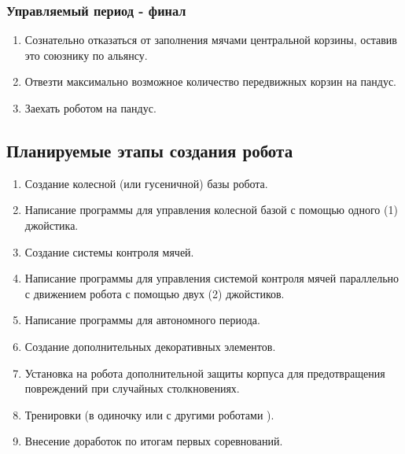 \subsubsection{Управляемый период - финал}
\begin{enumerate}
	\item Сознательно отказаться от заполнения мячами центральной корзины, оставив это союзнику по альянсу.
	\item Отвезти максимально возможное количество передвижных корзин на пандус.
	\item Заехать роботом на пандус. 
\end{enumerate}

\fillpage

\subsection{Планируемые этапы создания робота}
\begin{enumerate}
	\item Создание колесной (или гусеничной) базы робота.
	\item Написание программы для управления колесной базой с помощью одного (1) джойстика.
	\item Создание системы контроля мячей.
	\item Написание программы для управления системой контроля мячей параллельно с движением робота с помощью двух (2) джойстиков.
	\item Написание программы для автономного периода.
	\item Создание дополнительных декоративных элементов.
	\item Установка на робота дополнительной защиты корпуса для предотвращения повреждений при случайных столкновениях.
	\item Тренировки (в одиночку или с другими роботами ).
	\item Внесение доработок по итогам первых соревнований.
\end{enumerate}
	
\fillpage
